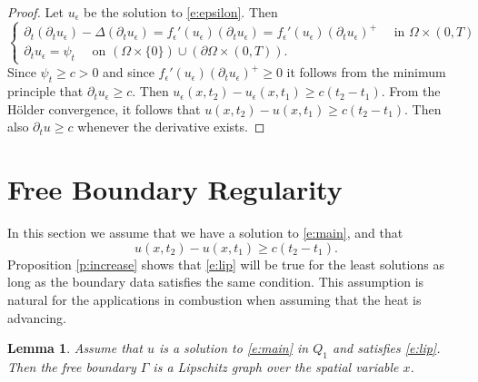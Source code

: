 \documentclass{amsart}
\newtheorem{lemma}[theorem]{Lemma}
\numberwithin{equation}{section}
\begin{document}
\begin{proof}
 Let $u_{\epsilon}$ be the solution to \eqref{e:epsilon}. Then 
 \[
 \begin{cases}
  \partial_t (\partial_t u_{\epsilon}) - \Delta (\partial_t u_{\epsilon}) = f_{\epsilon}'(u_{\epsilon}) (\partial_t u_{\epsilon})= f_{\epsilon}'(u_{\epsilon}) (\partial_t u_{\epsilon})^+ \quad \text{ in } \Omega \times (0,T) \\
  \partial_t u_{\epsilon}=\psi_t \quad \text{ on } (\Omega \times \{0\})\cup (\partial \Omega \times (0,T)). 
 \end{cases}
 \]
 Since $\psi_t \geq c>0$ and since $f_{\epsilon}'(u_{\epsilon}) (\partial_t u_{\epsilon})^+ \geq 0$ it follows from the minimum principle that $\partial_t u_{\epsilon} \geq c$. Then $u_{\epsilon}(x,t_2)-u_{\epsilon}(x,t_1)\geq c(t_2-t_1)$. From the H\"older convergence, it follows that $u(x,t_2)-u(x,t_1)\geq c(t_2-t_1)$. Then also $\partial_t u \geq c$ whenever the derivative exists.  
\end{proof}










\section{Free Boundary Regularity} \label{s:regularity}
 In this section we assume that we have a solution to \eqref{e:main}, and that 
 \begin{equation} \label{e:lip}
 u(x,t_2)-u(x,t_1) \geq c(t_2 - t_1).
 \end{equation}
 Proposition \ref{p:increase} shows that \eqref{e:lip} will be true for the least solutions as long as the boundary data satisfies the same condition. This assumption is natural for the applications in combustion when assuming that the heat is advancing. 

 \begin{lemma} \label{l:lipschitz}
   Assume that $u$ is a solution to \eqref{e:main} in $Q_1$ and satisfies \eqref{e:lip}. Then the free boundary $\Gamma$ is a Lipschitz graph over the spatial variable $x$.
 \end{lemma}
\end{document}
